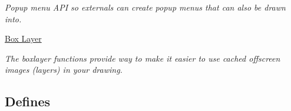 \begin{DoxyCompactItemize}
\begin{DoxyCompactList}\small\item\em Popup menu API so externals can create popup menus that can also be drawn into. \item\end{DoxyCompactList}\item 
\hyperlink{group__boxlayer}{Box Layer}


\begin{DoxyCompactList}\small\item\em The boxlayer functions provide way to make it easier to use cached offscreen images (layers) in your drawing. \item\end{DoxyCompactList}\end{DoxyCompactItemize}
\subsection*{Defines}
